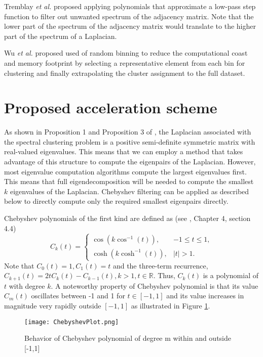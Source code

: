 \documentclass[10pt,a4paper, nocenter]{article}
\newcommand{\abs}[1]{\lvert {#1} \rvert}
\begin{document}
    Tremblay \textit{et al.} \cite{tremblay-compressive-SC-16} proposed applying polynomials that approximate a low-pass step function to filter out unwanted spectrum of the adjacency matrix. Note that the lower part of the spectrum of the adjacency matrix would translate to the higher part of the spectrum of a Laplacian. 
    
    Wu \textit{et al.} \cite{wu_random_binning} proposed used of random binning to reduce the computational coast and memory footprint by selecting a representative element from each bin for clustering and finally extrapolating the cluster assignment to the full dataset.
    
    \section{Proposed acceleration scheme}
    As shown in Proposition 1 and Proposition 3 of \cite{Luxburg2007}, the Laplacian associated with the spectral clustering problem is a positive semi-definite symmetric matrix with real-valued eigenvalues. This means that we can employ a method that takes advantage of this structure to compute the eigenpairs of the Laplacian. However, most eigenvalue computation algorithms compute the largest eigenvalues first. This means that full eigendecomposition will be needed to compute the smallest $k$ eigenvalues of the Laplacian. Chebyshev filtering can be applied as described below to directly compute only the required smallest eigenpairs directly. 
    
    Chebyshev polynomials of the first kind are defined as (see \cite{saad1992numerical}, Chapter 4, section 4.4) $$C_k(t) = \begin{cases} \cos(k \cos^{-1}(t)), &-1\le t \le 1, \\ \cosh(k \cosh^{-1}(t)), &\abs{t} > 1. \end{cases}$$ Note that $C_0(t)=1, C_1(t)=t$ and the three-term recurrence, $C_{k+1}(t)=2tC_k(t) - C_{k-1}(t), k>1, t\in \mathbb{R}$. Thus, $C_k(t)$ is a polynomial of $t$ with degree $k$. A noteworthy property of Chebyshev polynomial is that its value $C_{m}(t)$ oscillates between -1 and 1 for $t \in [-1,1]$ and its value increases in magnitude very rapidly outside $[-1,1]$ as illustrated in Figure \ref{fig:chebyshevPlot}. 
    
    
    \begin{figure}[h]
    	\texttt{[image: ChebyshevPlot.png]}
    	\caption{Behavior of Chebyshev polynomial of degree m within and outside [-1,1]}
    	\label{fig:chebyshevPlot}
    \end{figure}
    
\end{document}

